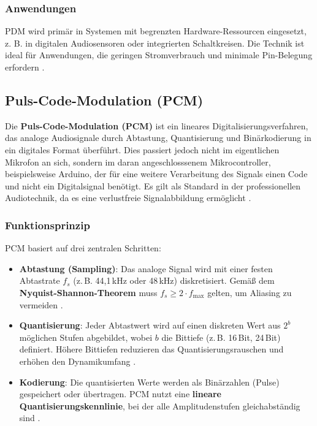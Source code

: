 \subsubsection{Anwendungen}
PDM wird primär in Systemen mit begrenzten Hardware-Ressourcen eingesetzt, z. B. in digitalen Audiosensoren oder integrierten Schaltkreisen. Die Technik ist ideal für Anwendungen, die geringen Stromverbrauch und minimale Pin-Belegung erfordern \cite{Weinzierl:2008}.

\bigskip

\subsection{Puls-Code-Modulation (PCM)}
Die \textbf{Puls-Code-Modulation (PCM)} ist ein lineares Digitalisierungsverfahren, das analoge Audiosignale durch Abtastung, Quantisierung und Binärkodierung in ein digitales Format überführt. Dies passiert jedoch nicht im eigentlichen Mikrofon an sich, sondern im daran angeschlosssenem Mikrocontroller, beispielsweise Arduino, der für eine weitere Verarbeitung des Signals einen Code und nicht ein Digitalsignal benötigt. Es gilt als Standard in der professionellen Audiotechnik, da es eine verlustfreie Signalabbildung ermöglicht \cite{Weinzierl:2008}.

\subsubsection{Funktionsprinzip}
PCM basiert auf drei zentralen Schritten:
\begin{itemize}
	\item \textbf{Abtastung (Sampling)}: Das analoge Signal wird mit einer festen Abtastrate \( f_s \) (z.\,B. 44,1\,kHz oder 48\,kHz) diskretisiert. Gemäß dem \textbf{Nyquist-Shannon-Theorem} muss \( f_s \geq 2 \cdot f_{\text{max}} \) gelten, um Aliasing zu vermeiden \cite{Weinzierl:2008}.
	
	\item \textbf{Quantisierung}: Jeder Abtastwert wird auf einen diskreten Wert aus \( 2^b \) möglichen Stufen abgebildet, wobei \( b \) die Bittiefe (z.\,B. 16\,Bit, 24\,Bit) definiert. Höhere Bittiefen reduzieren das Quantisierungsrauschen und erhöhen den Dynamikumfang \cite{Weinzierl:2008}.
	
	\item \textbf{Kodierung}: Die quantisierten Werte werden als Binärzahlen (Pulse) gespeichert oder übertragen. PCM nutzt eine \textbf{lineare Quantisierungskennlinie}, bei der alle Amplitudenstufen gleichabständig sind \cite{Weinzierl:2008}.
\end{itemize}

